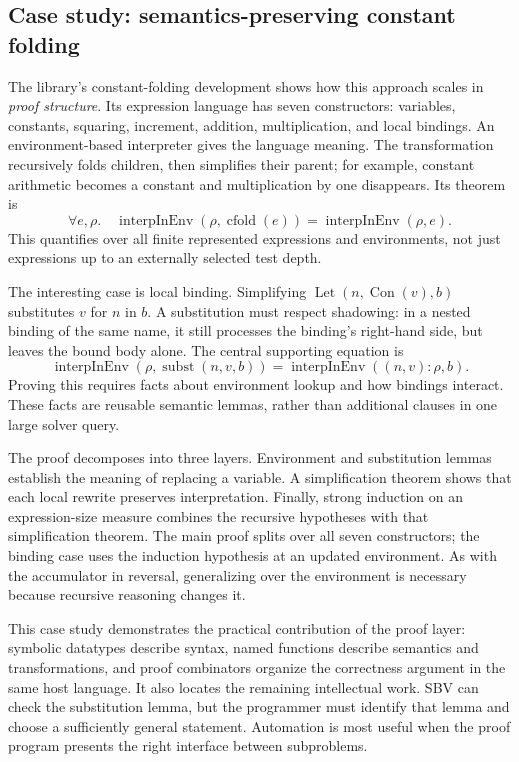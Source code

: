 \documentclass[acmsmall,screen,nonacm]{acmart}
\begin{document}
\subsection{Case study: semantics-preserving constant folding}

The library's constant-folding development shows how this approach scales in
\emph{proof structure}. Its expression language has seven constructors:
variables, constants, squaring, increment, addition, multiplication, and local
bindings. An environment-based interpreter gives the language meaning.
The transformation recursively folds children, then simplifies their parent;
for example, constant arithmetic becomes a constant and multiplication by one
disappears. Its theorem is
\[
 \forall e,\rho.\quad
 \operatorname{interpInEnv}(\rho,\operatorname{cfold}(e))
 =\operatorname{interpInEnv}(\rho,e).
\]
This quantifies over all finite represented expressions and environments, not
just expressions up to an externally selected test depth.

The interesting case is local binding. Simplifying
$\operatorname{Let}(n,\operatorname{Con}(v),b)$ substitutes $v$ for $n$ in $b$.
A substitution must respect shadowing: in a nested binding of the same name,
it still processes the binding's right-hand side, but leaves the bound body
alone. The central supporting equation is
\[
 \operatorname{interpInEnv}(\rho,\operatorname{subst}(n,v,b))
 =\operatorname{interpInEnv}((n,v):\rho,b).
\]
Proving this requires facts about environment lookup and how bindings interact.
These facts are reusable semantic lemmas, rather than additional clauses in
one large solver query.

The proof decomposes into three layers. Environment and substitution lemmas
establish the meaning of replacing a variable. A simplification theorem shows
that each local rewrite preserves interpretation. Finally, strong induction
on an expression-size measure combines the recursive hypotheses with that
simplification theorem. The main proof splits over all seven constructors;
the binding case uses the induction hypothesis at an updated environment.
As with the accumulator in reversal, generalizing over the environment is
necessary because recursive reasoning changes it.

This case study demonstrates the practical contribution of the proof layer:
symbolic datatypes describe syntax, named functions describe semantics and
transformations, and proof combinators organize the correctness argument in
the same host language. It also locates the remaining intellectual work.
SBV can check the substitution lemma, but the programmer must identify that
lemma and choose a sufficiently general statement. Automation is most useful
when the proof program presents the right interface between subproblems.
\end{document}
